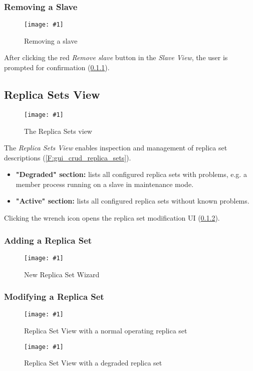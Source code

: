 \documentclass[a4paper, 11pt]{article}
\newcommand{\mamidscreenshot}[1]{\texttt{[image: \#1]}}
\newcommand{\uiel}[3]{\item \textbf{"#1" #2:} #3}
\begin{document}
\subsubsection{Removing a Slave}
\begin{figure}[H]
	\centering
	\mamidscreenshot{screenshots/slave_remove}
	\caption{Removing a slave}
\end{figure}
After clicking the red \textit{Remove slave} button in the \textit{Slave View}, the user is prompted for confirmation (\ref{}). %

\subsection{Replica Sets View}
\begin{figure}[H]
	\centering
	\mamidscreenshot{screenshots/replica_sets}
	\caption{The Replica Sets view}
\end{figure}
The \textit{Replica Sets View} enables inspection and management of replica set descriptions (\ref{F:gui_crud_replica_sets}).
\begin{itemize}
	\uiel{Degraded}{section}{lists all configured replica sets with problems, e.g. a member process running on a \gls{slave} in \gls{maintenance mode}}.
	\uiel{Active}{section}{lists all configured replica sets without known problems}.
\end{itemize}
Clicking the wrench icon opens the replica set modification UI (\ref{subsec:ui:modify_replica_set}).

\subsubsection{Adding a Replica Set}
\begin{figure}[H]
	\centering
	\mamidscreenshot{screenshots/new_replica_set}
	\caption{New Replica Set Wizard}
\end{figure}
\subsubsection{Modifying a Replica Set}\label{subsec:ui:modify_replica_set}
\begin{figure}[H]
	\centering
	\mamidscreenshot{screenshots/replica_set_overview_active.png}
	\caption{Replica Set View with a normal operating replica set}
\end{figure}
\begin{figure}[H]
	\centering
	\mamidscreenshot{screenshots/replica_set_overview_degraded}
	\caption{Replica Set View with a degraded replica set}
\end{figure}
\end{document}
